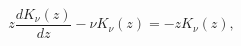 \begin{equation}
z\frac{dK_{\nu }\left(z\right)}{dz}-\nu K_{\nu }\left(z\right)=-zK_{\nu }\left(z\right),\end{equation}

